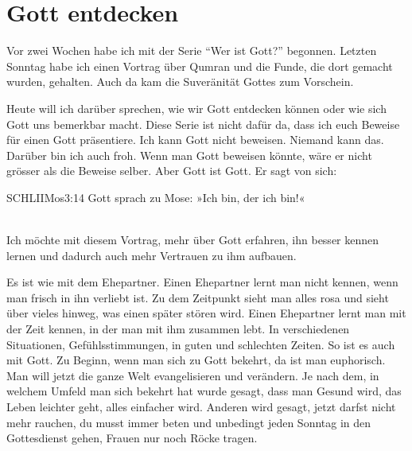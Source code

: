 \section{Gott entdecken}
\begin{otsblock} 
        Vor zwei Wochen habe ich mit der Serie \enquote{Wer ist Gott?} begonnen. Letzten Sonntag habe ich einen Vortrag über Qumran und die Funde, die dort gemacht wurden, gehalten. Auch da kam die Suveränität Gottes zum Vorschein.

        Heute will ich darüber sprechen, wie wir Gott entdecken können oder wie sich Gott uns bemerkbar macht. Diese Serie ist nicht dafür da, dass ich euch Beweise für einen Gott präsentiere. Ich kann Gott nicht beweisen. Niemand kann das. Darüber bin ich auch froh. Wenn man Gott beweisen könnte, wäre er nicht grösser als die Beweise selber. Aber Gott ist Gott. Er sagt von sich:
        \begin{bibelbox}{SCHL}{IIMos}{3:14}
            Gott sprach zu Mose: »Ich bin, der ich bin!«
        \end{bibelbox}
        \\

        Ich möchte mit diesem Vortrag, mehr über Gott erfahren, ihn besser kennen lernen und dadurch auch mehr Vertrauen zu ihm aufbauen. 
        
        Es ist wie mit dem Ehepartner. Einen Ehepartner lernt man nicht kennen, wenn man frisch in ihn verliebt ist. Zu dem Zeitpunkt sieht man alles rosa und sieht über vieles hinweg, was einen später stören wird. Einen Ehepartner lernt man mit der Zeit kennen, in der man mit ihm zusammen lebt. In verschiedenen Situationen, Gefühlsstimmungen, in guten und schlechten Zeiten. So ist es auch mit Gott. Zu Beginn, wenn man sich zu Gott bekehrt, da ist man euphorisch. Man will jetzt die ganze Welt evangelisieren und verändern. Je nach dem, in welchem Umfeld man sich bekehrt hat wurde gesagt, dass man Gesund wird, das Leben leichter geht, alles einfacher wird. Anderen wird gesagt, jetzt darfst nicht mehr rauchen, du musst immer beten und unbedingt jeden Sonntag in den Gottesdienst gehen, Frauen nur noch Röcke tragen.        


\end{otsblock}
